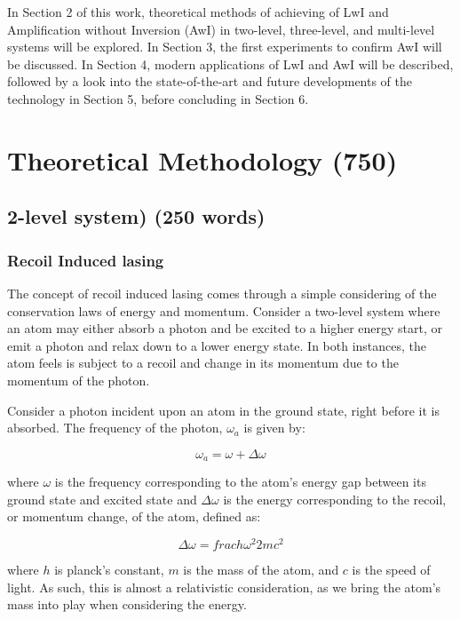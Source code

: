 \documentclass{article}
\begin{document}
In Section 2 of this work, theoretical methods of achieving of LwI and Amplification without Inversion (AwI) in two-level, three-level, and multi-level systems will be explored. In Section 3, the first experiments to confirm AwI will be discussed. In Section 4, modern applications of LwI and AwI will be described, followed by a look into the state-of-the-art and future developments of the technology in Section 5, before concluding in Section 6.

\section{Theoretical Methodology (750)}
\subsection{2-level system) (250 words)}
\subsubsection{Recoil Induced lasing}

The concept of recoil induced lasing comes through a simple considering of the conservation laws of energy and momentum. Consider a two-level system where an atom may either absorb a photon and be excited to a higher energy start, or emit a photon and relax down to a lower energy state. In both instances, the atom feels is subject to a recoil and change in its momentum due to the momentum of the photon.

Consider a photon incident upon an atom in the ground state, right before it is absorbed. The frequency of the photon, $\omega_{a}$ is given by:

\begin{equation}
\omega_{a}=\omega+\Delta\omega
\end{equation}\label{eq:1}


where $\omega$ is the frequency corresponding to the atom's energy gap between its ground state and excited state and $\Delta\omega$ is the energy corresponding to the recoil, or momentum change, of the atom, defined as:

\begin{equation}
\Delta\omega = frac{h\omega^{2}}{2mc^{2}}
\end{equation}\label{eq:2}


where $h$ is planck's constant, $m$ is the mass of the atom, and $c$ is the speed of light. As such, this is almost a relativistic consideration, as we bring the atom's mass into play when considering the energy.
\end{document}
